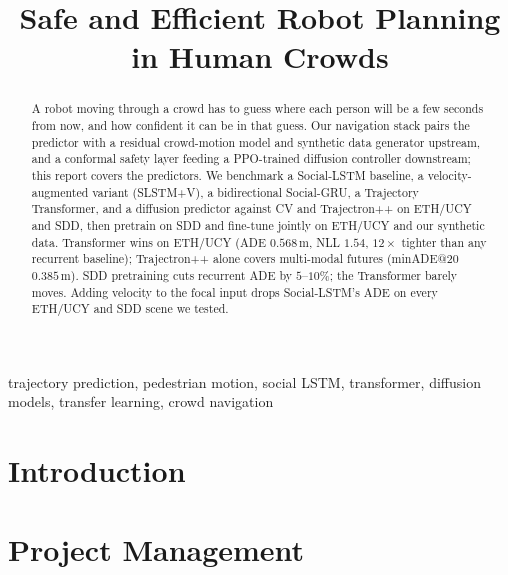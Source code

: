 \documentclass[conference]{IEEEtran}
\begin{document}
\title{Safe and Efficient Robot Planning in Human Crowds}
\author{
}
\maketitle

\begin{abstract}
A robot moving through a crowd has to guess where each person will be
a few seconds from now, and how confident it can be in that guess.  Our
navigation stack pairs the predictor with a residual crowd-motion model
and synthetic data generator upstream, and a conformal safety layer
feeding a PPO-trained diffusion controller downstream; this report
covers the predictors.  We benchmark a Social-LSTM baseline, a
velocity-augmented variant (SLSTM+V), a bidirectional Social-GRU, a
Trajectory Transformer, and a diffusion predictor against CV and
Trajectron++ on ETH/UCY and SDD, then pretrain on SDD and fine-tune
jointly on ETH/UCY and our synthetic data.  Transformer wins on ETH/UCY
(ADE $0.568$\,m, NLL $1.54$, $12\times$ tighter than any recurrent
baseline); Trajectron++ alone covers multi-modal futures (minADE@20
$0.385$\,m).  SDD pretraining cuts recurrent ADE by $5$--$10\%$; the
Transformer barely moves.  Adding velocity to the focal input drops Social-LSTM's ADE on every
ETH/UCY and SDD scene we tested.
\end{abstract}

\begin{IEEEkeywords}
trajectory prediction, pedestrian motion, social LSTM, transformer,
diffusion models, transfer learning, crowd navigation
\end{IEEEkeywords}

\section{Introduction}

\section{Project Management}
\end{document}

